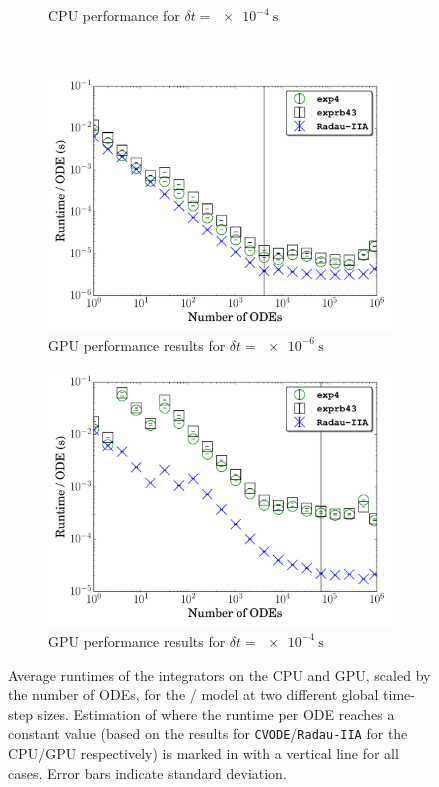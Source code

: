 \documentclass[preprint]{elsarticle}
\begin{document}
\begin{figure}[htb]
\begin{subfigure}{0.49\textwidth}
      \caption{CPU performance for $\delta t = \SI{e-4}{\second}$}
      \label{F:h2_cpu_perf_large}
  \end{subfigure}\\
  \begin{subfigure}{0.49\textwidth}
      \includegraphics[width=\linewidth]{H2_1e-06_gpu.pdf}
      \caption{GPU performance results for $\delta t = \SI{e-6}{\second}$}
      \label{F:h2_gpu_perf_small}
  \end{subfigure}
  \begin{subfigure}{0.49\textwidth}
      \includegraphics[width=\linewidth]{H2_1e-04_gpu.pdf}
      \caption{GPU performance results for $\delta t = \SI{e-4}{\second}$}
      \label{F:h2_gpu_perf_large}
  \end{subfigure}
  \caption{Average runtimes of the integrators on the CPU and GPU, scaled by the number of ODEs, for the \slash{} model at two different global time-step sizes.
  Estimation of where the runtime per ODE reaches a constant value (based on the results for \texttt{CVODE}\slash\texttt{Radau-IIA} for the CPU\slash GPU respectively) is marked in with a vertical line for all cases.
  Error bars indicate standard deviation.}
  \label{F:H2_perf}
\end{figure}
\end{document}
